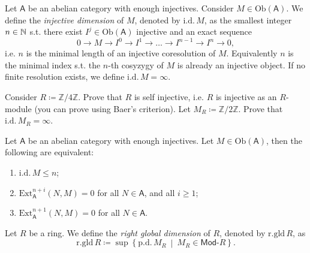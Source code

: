\begin{defn}
	Let $\mathsf{A}$ be an abelian category with enough injectives.
	Consider $M \in \mathrm{Ob} \left(\mathsf{A}\right)$.
	We define the {\em injective dimension} of $M$, 
	denoted by $\mathrm{i.d.}\, M$, as the smallest integer $n \in \mathbb{N}$ s.t.
	there exist $I^j \in \mathrm{Ob} \left(\mathsf{A}\right)$ injective and an exact sequence
	\begin{equation}
	0 \to M \to I^0 \to I^1 \to \ldots \to
	I^{n-1} \to I^n \to 0
	,\end{equation} 
	i.e. $n$ is the minimal length of an injective coresolution of $M$.
	Equivalently $n$ is the minimal index s.t. the $n$-th cosyzygy of $M$ is already
	an injective object.
	If no finite resolution exists, we define $\mathrm{i.d.}\, M = \infty$.
\end{defn}

\begin{ex}
	Consider $R \coloneqq \mathbb{Z}/4\mathbb{Z}$.
	Prove that $R$ is self injective, i.e. $R$ is injective as an $R$-module
	(you can prove using Baer's criterion).
	Let $M_R \coloneqq \mathbb{Z}/2\mathbb{Z}$.
	Prove that $\mathrm{i.d.}\, M_R = \infty$.
\end{ex} 

\begin{prop}
	Let $\mathsf{A}$ be an abelian category with enough injectives.
	Let $M \in \mathrm{Ob} \left(\mathsf{A}\right)$, then the following are equivalent:
	\begin{enumerate}
		\item $\mathrm{i.d.}\, M \leq n$;
		\item $\mathrm{Ext}^{n+i}_{\mathsf{A}} (N,M) = 0$ for all $N \in \mathsf{A}$, and all $i \geq 1$;
		\item $\mathrm{Ext}^{n+1}_{\mathsf{A}} (N,M) = 0$ for all $N \in \mathsf{A}$.
	\end{enumerate}
\end{prop} 

\begin{defn}
	Let $R$ be a ring.
	We define the {\em right global dimension} of $R$, denoted by
	$\mathrm{r.gld}\, R$, as
	\begin{equation}
	\mathrm{r.gld}\, R \coloneqq \sup \left\{ \mathrm{p.d.}\, M_R \ \middle|\ M_R \in \mathsf{Mod}\text{-}R \right\}
	.\end{equation} 
\end{defn}

